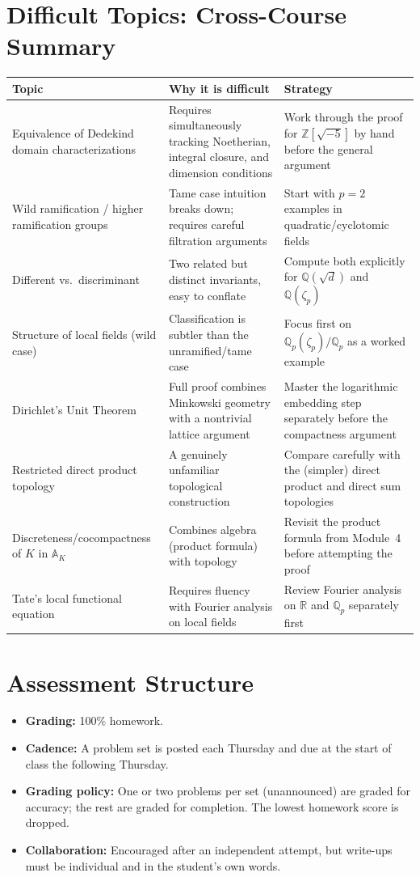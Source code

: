 \documentclass[11pt]{article}
\newcommand{\Q}{\mathbb{Q}}
\newcommand{\Z}{\mathbb{Z}}
\begin{document}
\section{Difficult Topics: Cross-Course Summary}

\begin{longtable}{@{}p{4.3cm}p{6.3cm}p{3.9cm}@{}}
\toprule
\textbf{Topic} & \textbf{Why it is difficult} & \textbf{Strategy} \\
\midrule
\endhead
Equivalence of Dedekind domain characterizations & Requires simultaneously tracking Noetherian, integral closure, and dimension conditions & Work through the proof for $\Z[\sqrt{-5}]$ by hand before the general argument \\
Wild ramification / higher ramification groups & Tame case intuition breaks down; requires careful filtration arguments & Start with $p=2$ examples in quadratic/cyclotomic fields \\
Different vs.\ discriminant & Two related but distinct invariants, easy to conflate & Compute both explicitly for $\Q(\sqrt{d})$ and $\Q(\zeta_p)$ \\
Structure of local fields (wild case) & Classification is subtler than the unramified/tame case & Focus first on $\Q_p(\zeta_p)/\Q_p$ as a worked example \\
Dirichlet's Unit Theorem & Full proof combines Minkowski geometry with a nontrivial lattice argument & Master the logarithmic embedding step separately before the compactness argument \\
Restricted direct product topology & A genuinely unfamiliar topological construction & Compare carefully with the (simpler) direct product and direct sum topologies \\
Discreteness/cocompactness of $K$ in $\mathbb{A}_K$ & Combines algebra (product formula) with topology & Revisit the product formula from Module~4 before attempting the proof \\
Tate's local functional equation & Requires fluency with Fourier analysis on local fields & Review Fourier analysis on $\mathbb{R}$ and $\Q_p$ separately first \\
\bottomrule
\end{longtable}

\section{Assessment Structure}
\begin{itemize}[leftmargin=*]
  \item \textbf{Grading:} 100\% homework.
  \item \textbf{Cadence:} A problem set is posted each Thursday and due at the start of class the following Thursday.
  \item \textbf{Grading policy:} One or two problems per set (unannounced) are graded for accuracy; the rest are graded for completion. The lowest homework score is dropped.
  \item \textbf{Collaboration:} Encouraged after an independent attempt, but write-ups must be individual and in the student's own words.
\end{itemize}
\end{document}
